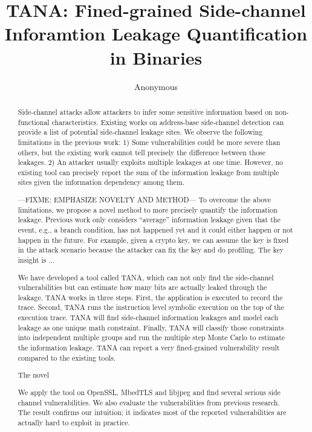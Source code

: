 \documentclass[conference]{IEEEtran}
\begin{document}
\title{TANA: Fined-grained Side-channel Inforamtion Leakage Quantification in Binaries}
\author{Anonymous}

\maketitle

\begin{abstract}
Side-channel attacks allow attackers to infer some sensitive information based on 
non-functional characteristics. Existing works on address-base side-channel detection 
can provide a list of potential side-channel leakage sites. We observe 
 the following limitations in the previous work: 1) 
Some vulnerabilities could be more severe than others, but the existing work 
cannot tell precisely the difference between those leakages. 2)  An attacker usually exploits multiple 
leakages at one time. However, no existing tool can precisely report
the sum of the information leakage from multiple sites given the information dependency among them.

---FIXME: EMPHASIZE NOVELTY AND METHOD---
To overcome the above limitations, we propose a novel method
to more precisely quantify the information leakage. Previous work only considers
``average'' information leakage given that the event, e.g., a branch condition, has not happened yet and
it could either happen or not happen in the future. For example, given a crypto key, we can assume the key is fixed
in the attack scenario because the attacker can fix the key and do profiling. The key insight is ...


We have developed a tool called TANA, which can not only 
find the side-channel vulnerabilities but can estimate how many bits are actually leaked 
through the leakage. TANA works in three steps. First, the application is executed to record the 
trace. Second, TANA runs the instruction level symbolic execution on the top of the 
execution trace. TANA will find side-channel information leakages and model each leakage 
as one unique math constraint. Finally, TANA will classify those constraints into 
independent multiple groups and run the multiple step Monte Carlo to estimate the 
information leakage. TANA can report a very fined-grained vulnerability result 
compared to the existing tools.

The novel

We apply the tool on OpenSSL, MbedTLS and libjpeg and find several serious side channel 
vulnerabilities. We also evaluate the vulnerabilities from previous research. The result 
confirms our intuition; it 
indicates most of the reported vulnerabilities are actually hard to exploit in practice.

\end{abstract}

\IEEEpeerreviewmaketitle
{}














\end{document}
